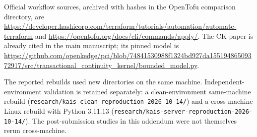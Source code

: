\documentclass[10pt,a4paper]{article}
\begin{document}
Official workflow sources, archived with hashes in the OpenTofu comparison directory, are \url{https://developer.hashicorp.com/terraform/tutorials/automation/automate-terraform} and \url{https://opentofu.org/docs/cli/commands/apply/}. The CK paper is already cited in the main manuscript; its pinned model is \url{https://github.com/openkedge/pci/blob/74841530988f1324bd927da15519486509372917/src/transactional_continuity_kernel/bounded_model.py}.

The reported rebuilds used new directories on the same machine. Independent-environment validation is retained separately: a clean-environment same-machine rebuild (\nolinkurl{research/kais-clean-reproduction-2026-10-14/}) and a cross-machine Linux rebuild with Python 3.11.13 (\nolinkurl{research/kais-server-reproduction-2026-10-14/}). The post-submission studies in this addendum were not themselves rerun cross-machine.
\end{document}
